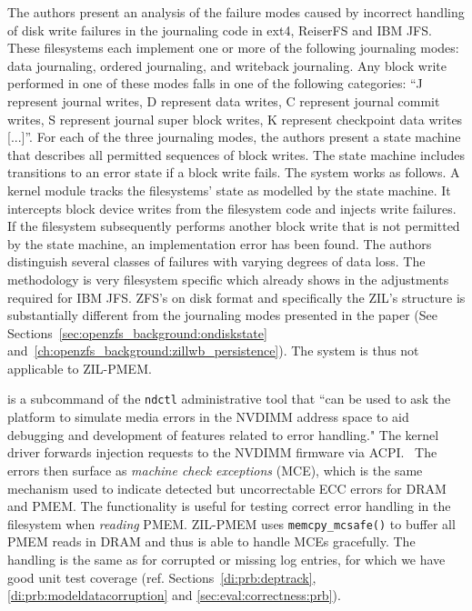 \documentclass[12pt,a4paper,twoside]{book}
\begin{document}
The authors present an analysis of the failure modes caused by incorrect handling of disk write failures in the journaling code in ext4, ReiserFS and IBM JFS.
These filesystems each implement one or more of the following journaling modes: data journaling, ordered journaling, and writeback journaling.
Any block write performed in one of these modes falls in one of the following categories:
“J represent journal writes, D represent data writes, C represent journal commit writes, S represent journal super block writes, K represent checkpoint data writes [...]”.
For each of the three journaling modes, the authors present a state machine that describes all permitted sequences of block writes.
The state machine includes transitions to an error state if a block write fails.
The system works as follows.
A kernel module tracks the filesystems' state as modelled by the state machine.
It intercepts block device writes from the filesystem code and injects write failures.
If the filesystem subsequently performs another block write that is not permitted by the state machine, an implementation error has been found.
The authors distinguish several classes of failures with varying degrees of data loss.
The methodology is very filesystem specific which already shows in the adjustments required for IBM JFS.
ZFS's on disk format and specifically the ZIL's structure is substantially different from the journaling modes presented in the paper (See Sections~\ref{sec:openzfs_background:ondiskstate} and~\ref{ch:openzfs_background:zillwb_persistence}).
The system is thus not applicable to ZIL-PMEM.

 is a subcommand of the \lstinline{ndctl} administrative tool that
``can be used to ask the platform to simulate media errors in the NVDIMM address space to aid debugging and development of features related to error handling."
The kernel driver forwards injection requests to the NVDIMM firmware via ACPI.~\cite{NdctlPATCHV2}
The errors then surface as \textit{machine check exceptions} (MCE), which is the same mechanism used to indicate detected but uncorrectable ECC errors for DRAM and PMEM.
The functionality is useful for testing correct error handling in the filesystem when \textit{reading} PMEM.
ZIL-PMEM uses \lstinline{memcpy_mcsafe()} to buffer all PMEM reads in DRAM and thus is able to handle MCEs gracefully.
The handling is the same as for corrupted or missing log entries, for which we have good unit test coverage (ref. Sections~\ref{di:prb:deptrack}, \ref{di:prb:modeldatacorruption} and \ref{sec:eval:correctness:prb}).
\end{document}
